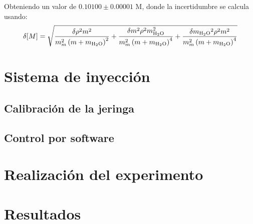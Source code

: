 	Obteniendo un valor de $0.10100\pm 0.00001$ M, donde la incertidumbre se calcula usando:
	\begin{equation}
		\delta[M] = \sqrt{\frac{\delta\rho^{2} m^{2}}{m_m^{2} \left(m + m_{\text{\ce{H2O}}}\right)^{2}} + \frac{\delta m^{2} \rho^{2} m_{\text{\ce{H2O}}}^{2}}{m_m^{2} \left(m + m_{\text{\ce{H2O}}}\right)^{4}} + \frac{\delta{m_{\text{\ce{H2O}}}}^{2} \rho^{2} m^{2}}{m_m^{2} \left(m + m_{\text{\ce{H2O}}}\right)^{4}}}
	\end{equation}
\section{Sistema de inyecci\'on}
	\subsection{Calibraci\'on de la jeringa}
	\subsection{Control por software}
	
\section{Realizaci\'on del experimento}

\section{Resultados}


		